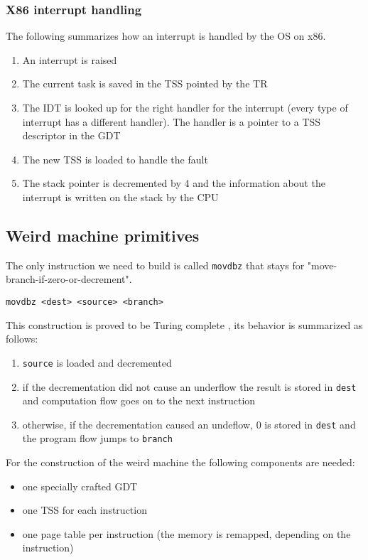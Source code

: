 \documentclass[11pt,twoside,a4paper]{article}
\begin{document}
\subsubsection{X86 interrupt handling}

The following summarizes how an interrupt is handled by the OS on x86.

\begin{enumerate}
\item An interrupt is raised
\item The current task is saved in the TSS pointed by the TR
\item The IDT is looked up for the right handler for the interrupt (every type of interrupt has a different handler). The handler is a pointer to a TSS descriptor in the GDT
\item The new TSS is loaded to handle the fault
\item The stack pointer is decremented by 4 and the information about the interrupt is written on the stack by the CPU
\end{enumerate}

\subsection{Weird machine primitives}

The only instruction we need to build is called \texttt{movdbz} that stays for "move-branch-if-zero-or-decrement".

\texttt{movdbz <dest> <source> <branch>}

This construction is proved to be Turing complete \cite{mmu_machine}, its behavior is summarized as follows:
\begin{enumerate}
\item \texttt{source} is loaded and decremented
\item if the decrementation did not cause an underflow the result is stored in \texttt{dest} and computation flow goes on to the next instruction
\item otherwise, if the decrementation caused an undeflow, 0 is stored in \texttt{dest} and the program flow jumps to \texttt{branch}
\end{enumerate}

For the construction of the weird machine the following components are needed:
\begin{itemize}
\item one specially crafted GDT
\item one TSS for each instruction
\item one page table per instruction (the memory is remapped, depending on the instruction)
\end{itemize}
\end{document}
